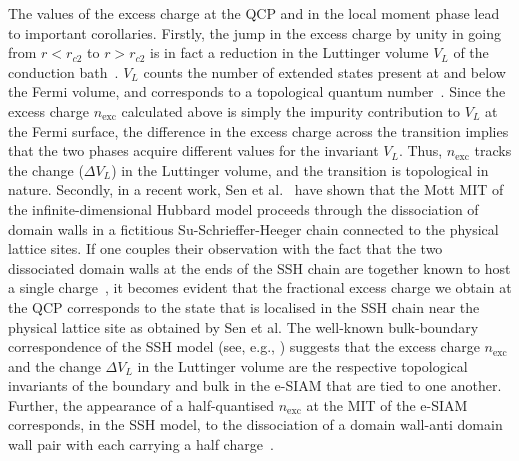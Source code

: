 The values of the excess charge at the QCP and in the local moment phase lead to important corollaries. Firstly, the jump in the excess charge by unity in going from \(r < r_{c2}\) to \(r > r_{c2}\) is in fact a reduction in the Luttinger volume \(V_L\) of the conduction bath~\cite{luttinger1960fermi,martin_1982}. \(V_L\) counts the number of extended states present at and below the Fermi volume, and corresponds to a  topological quantum number~\cite{oshikawa2000topological,seki2017topological,Heath2020,anirbanurg1}. Since the excess charge \(n_\text{exc}\) calculated above is simply the impurity contribution to \(V_L\) at the Fermi surface, the difference in the excess charge across the transition implies that the two phases acquire different values for the invariant \(V_L\). Thus, $n_\text{exc}$ tracks the change ($\Delta V_{L}$) in the Luttinger volume, and the transition is topological in nature. Secondly, in a recent work, Sen et al.~\cite{sen_mitchell_2020} have shown that the Mott MIT of the infinite-dimensional Hubbard model proceeds through the dissociation of domain walls in a fictitious Su-Schrieffer-Heeger chain connected to the physical lattice sites. If one couples their observation with the fact that the two dissociated domain walls at the ends of the SSH chain are together known to host a single charge~\cite{SSHRMP1988,stone_1985}, it becomes evident that the fractional excess charge we obtain at the QCP corresponds to the state that is localised in the SSH chain near the physical lattice site as obtained by Sen et al. The well-known bulk-boundary correspondence of the SSH model (see, e.g., \cite{Asboth_2016}) suggests that the excess charge $n_\text{exc}$ and the change $\Delta V_{L}$ in the Luttinger volume are the respective topological invariants of the boundary and bulk in the e-SIAM that are tied to one another. Further, the appearance of a half-quantised $n_\text{exc}$ at the MIT of the e-SIAM corresponds, in the SSH model, to the dissociation of a domain wall-anti domain wall pair with each carrying a half charge~\cite{SSHRMP1988,stone_1985}.

